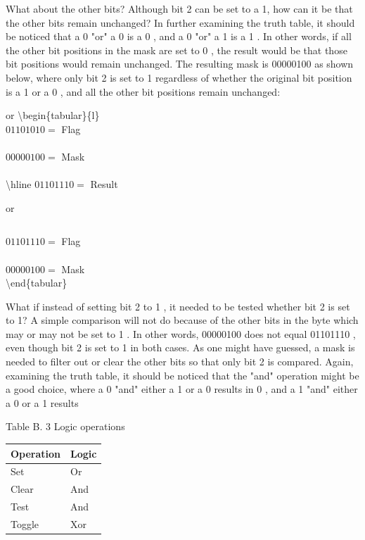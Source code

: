 \documentclass[10pt]{article}
\begin{document}
What about the other bits? Although bit 2 can be set to a 1, how can it be that the other bits remain unchanged? In further examining the truth table, it should be noticed that a 0 "or" a 0 is a 0 , and a 0 "or" a 1 is a 1 . In other words, if all the other bit positions in the mask are set to 0 , the result would be that those bit positions would remain unchanged. The resulting mask is 00000100 as shown below, where only bit 2 is set to 1 regardless of whether the original bit position is a 1 or a 0 , and all the other bit positions remain unchanged:

or \textbackslash begin\{tabular\}\{l\}\\
$01101010=$ Flag \\
\\
$00000100=$ Mask \\
\\
\textbackslash hline $01101110=$ Result

 or $\quad$\begin{tabular}{l}
\end{tabular}

$01101110=$ Flag \\
\\
$00000100=$ Mask\\
\textbackslash end\{tabular\}

What if instead of setting bit 2 to 1 , it needed to be tested whether bit 2 is set to 1? A simple comparison will not do because of the other bits in the byte which may or may not be set to 1 . In other words, 00000100 does not equal 01101110 , even though bit 2 is set to 1 in both cases. As one might have guessed, a mask is needed to filter out or clear the other bits so that only bit 2 is compared. Again, examining the truth table, it should be noticed that the "and" operation might be a good choice, where a 0 "and" either a 1 or a 0 results in 0 , and a 1 "and" either a 0 or a 1 results

Table B. 3 Logic operations

\begin{center}
\begin{tabular}{|l|l|}
\hline
Operation & Logic \\
\hline
Set & Or \\
\hline
Clear & And \\
\hline
Test & And \\
\hline
Toggle & Xor \\
\hline
\end{tabular}
\end{center}
\end{document}
